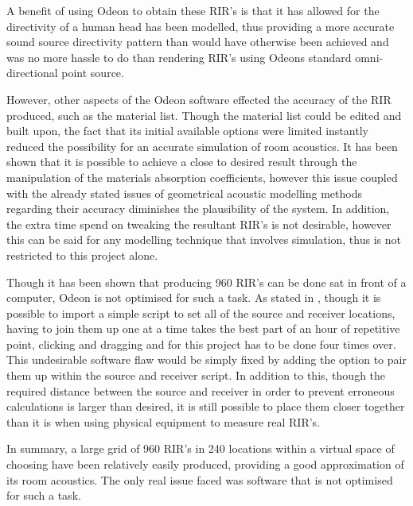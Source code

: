 \documentclass[../../main.tex]{subfiles}
\begin{document}


			A benefit of using Odeon to obtain these \ac{RIR}'s is that it has allowed for the directivity of a human head has been modelled, thus providing a more accurate sound source directivity pattern than would have otherwise been achieved and was no more hassle to do than rendering \ac{RIR}'s using Odeons standard omni-directional point source.
			

			However, other aspects of the Odeon software effected the accuracy of the \ac{RIR} produced, such as the material list. Though the material list could be edited and built upon, the fact that its initial available options were limited instantly reduced the possibility for an accurate simulation of room acoustics. It has been shown that it is possible to achieve a close to desired result through the manipulation of the materials absorption coefficients, however this issue coupled with the already stated issues of geometrical acoustic modelling methods regarding their accuracy diminishes the plausibility of the system. In addition, the extra time spend on tweaking the resultant \ac{RIR}'s is not desirable, however this can be said for any modelling technique that involves simulation, thus is not restricted to this project alone.

			Though it has been shown that producing 960 \ac{RIR}'s can be done sat in front of a computer, Odeon is not optimised for such a task. As stated in , though it is possible to import a simple script to set all of the source and receiver locations, having to join them up one at a time takes the best part of an hour of repetitive point, clicking and dragging and for this project has to be done four times over. This undesirable software flaw would be simply fixed by adding the option to pair them up within the source and receiver script. In addition to this, though the required distance between the source and receiver in order to prevent erroneous calculations is larger than desired, it is still possible to place them closer together than it is when using physical equipment to measure real \ac{RIR}'s. 
			
			In summary, a large grid of 960 \ac{RIR}'s in 240 locations within a virtual space of choosing have been relatively easily produced, providing a good approximation of its room acoustics. The only real issue faced was software that is not optimised for such a task.


	
\end{document}

